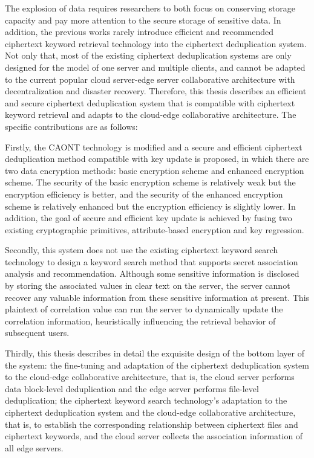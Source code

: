 \documentclass[promaster]{thesis-uestc}
\begin{document}
\begin{englishabstract}

    The explosion of data requires researchers to both focus on conserving storage capacity and pay more attention to the secure storage of sensitive data. In addition, the previous works rarely introduce efficient and recommended ciphertext keyword retrieval technology into the ciphertext deduplication system. Not only that, most of the existing ciphertext deduplication systems are only designed for the model of one server and multiple clients, and cannot be adapted to the current popular cloud server-edge server collaborative architecture with decentralization and disaster recovery. Therefore, this thesis describes an efficient and secure ciphertext deduplication system that is compatible with ciphertext keyword retrieval and adapts to the cloud-edge collaborative architecture. The specific contributions are as follows:

    Firstly, the CAONT technology is modified and a secure and efficient ciphertext deduplication method compatible with key update is proposed, in which there are two data encryption methods: basic encryption scheme and enhanced encryption scheme. The security of the basic encryption scheme is relatively weak but the encryption efficiency is better, and the security of the enhanced encryption scheme is relatively enhanced but the encryption efficiency is slightly lower. In addition, the goal of secure and efficient key update is achieved by fusing two existing cryptographic primitives, attribute-based encryption and key regression.

    Secondly, this system does not use the existing ciphertext keyword search technology to design a keyword search method that supports secret association analysis and recommendation. Although some sensitive information is disclosed by storing the associated values in clear text on the server, the server cannot recover any valuable information from these sensitive information at present. This plaintext of correlation value can run the server to dynamically update the correlation information, heuristically influencing the retrieval behavior of subsequent users.

    Thirdly, this thesis describes in detail the exquisite design of the bottom layer of the system: the fine-tuning and adaptation of the ciphertext deduplication system to the cloud-edge collaborative architecture, that is, the cloud server performs data block-level deduplication and the edge server performs file-level deduplication; the ciphertext keyword search technology's adaptation to the ciphertext deduplication system and the cloud-edge collaborative architecture, that is, to establish the corresponding relationship between ciphertext files and ciphertext keywords, and the cloud server collects the association information of all edge servers.


\end{englishabstract}
\end{document}

